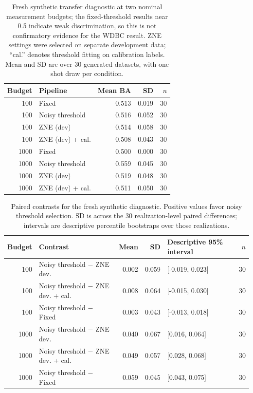 \documentclass[10pt]{article}
\begin{document}
\begin{table}[H]\centering\small
\caption{Fresh synthetic transfer diagnostic at two nominal measurement budgets; the fixed-threshold results near 0.5 indicate weak discrimination, so this is not confirmatory evidence for the WDBC result. ZNE settings were selected on separate development data; ``cal.'' denotes threshold fitting on calibration labels. Mean and SD are over 30 generated datasets, with one shot draw per condition.}
\label{tab:fresh-diagnostic}
\begin{tabular}{@{}r l r r r@{}}\toprule
Budget & Pipeline & Mean BA & SD & $n$ \\
\midrule
100 & Fixed & 0.513 & 0.019 & 30 \\
100 & Noisy threshold & 0.516 & 0.052 & 30 \\
100 & ZNE (dev) & 0.514 & 0.058 & 30 \\
100 & ZNE (dev) + cal. & 0.508 & 0.043 & 30 \\
1000 & Fixed & 0.500 & 0.000 & 30 \\
1000 & Noisy threshold & 0.559 & 0.045 & 30 \\
1000 & ZNE (dev) & 0.519 & 0.048 & 30 \\
1000 & ZNE (dev) + cal. & 0.511 & 0.050 & 30 \\
\bottomrule\end{tabular}\end{table}

\begin{table}[H]\centering\scriptsize
\caption{Paired contrasts for the fresh synthetic diagnostic. Positive values favor noisy threshold selection. SD is across the 30 realization-level paired differences; intervals are descriptive percentile bootstraps over those realizations.}
\label{tab:confirm-paired}
\begin{tabular}{@{}r l r r l r@{}}\toprule
Budget & Contrast & Mean & SD & Descriptive 95\% interval & $n$ \\
\midrule
100 & Noisy threshold $-$ ZNE dev. & 0.002 & 0.059 & [-0.019, 0.023] & 30 \\
100 & Noisy threshold $-$ ZNE dev. + cal. & 0.008 & 0.064 & [-0.015, 0.030] & 30 \\
100 & Noisy threshold $-$ Fixed & 0.003 & 0.043 & [-0.013, 0.018] & 30 \\
1000 & Noisy threshold $-$ ZNE dev. & 0.040 & 0.067 & [0.016, 0.064] & 30 \\
1000 & Noisy threshold $-$ ZNE dev. + cal. & 0.049 & 0.057 & [0.028, 0.068] & 30 \\
1000 & Noisy threshold $-$ Fixed & 0.059 & 0.045 & [0.043, 0.075] & 30 \\
\bottomrule\end{tabular}\end{table}
\end{document}
